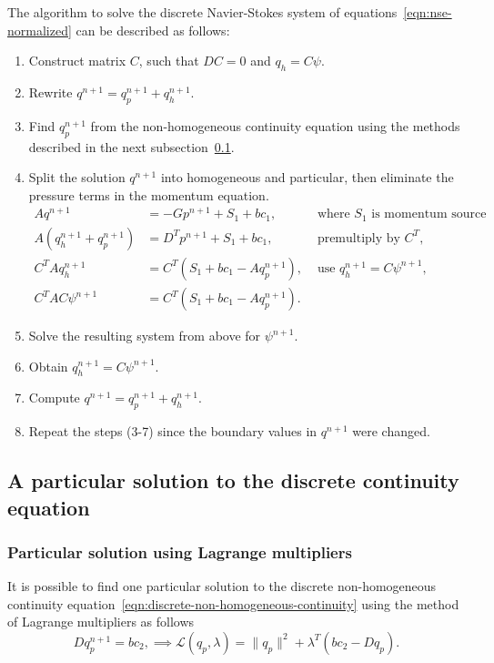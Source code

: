 \documentclass{article}
\begin{document}

The algorithm to solve the discrete Navier-Stokes system of equations~\eqref{eqn:nse-normalized} can be described as follows:
\begin{enumerate}
	\item Construct matrix $C$, such that $DC=0$ and $q_h=C\psi$.
	\item Rewrite $q^{n+1}=q^{n+1}_p+q^{n+1}_h$.
	\item Find $q^{n+1}_p$ from the non-homogeneous continuity equation using the methods described in the next subsection~\ref{sec:continuity-particular-solution}.
	\item Split the solution $q^{n+1}$ into homogeneous and particular, then eliminate the pressure terms in the momentum equation.
		\begin{align*}
			Aq^{n+1}&=-Gp^{n+1}+S_1+bc_1,&\text{ where $S_1$ is momentum source term,}\\
			A(q^{n+1}_h+q^{n+1}_p)&=D^Tp^{n+1}+S_1+bc_1, &\text{ premultiply by $C^T$,} \\
			C^TAq^{n+1}_h&=C^T(S_1+bc_1-Aq^{n+1}_p), &\text{ use $q^{n+1}_h=C\psi^{n+1}$,}\\
			C^TAC\psi^{n+1}&=C^T(S_1+bc_1-Aq^{n+1}_p).
		\end{align*}
	\item Solve the resulting system from above for $\psi^{n+1}$. 
	\item Obtain $q_h^{n+1}=C\psi^{n+1}$.
	\item Compute $q^{n+1}=q^{n+1}_p+q^{n+1}_h$.
	\item Repeat the steps (3-7) since the boundary values in $q^{n+1}$ were changed.
\end{enumerate}



\subsection{A particular solution to the discrete continuity equation}\label{sec:continuity-particular-solution}
\subsubsection{Particular solution using Lagrange multipliers}
It is possible to find one particular solution to the discrete non-homogeneous continuity equation~\eqref{eqn:discrete-non-homogeneous-continuity} using the method of Lagrange multipliers as follows
\begin{equation}\label{eqn:lagrange-multipliers}
	Dq_p^{n+1}=bc_2,\implies \mathcal{L}(q_p,\lambda)=
\|q_p\|^2+\lambda^T(bc_2-D q_p).
\end{equation}
\end{document}
